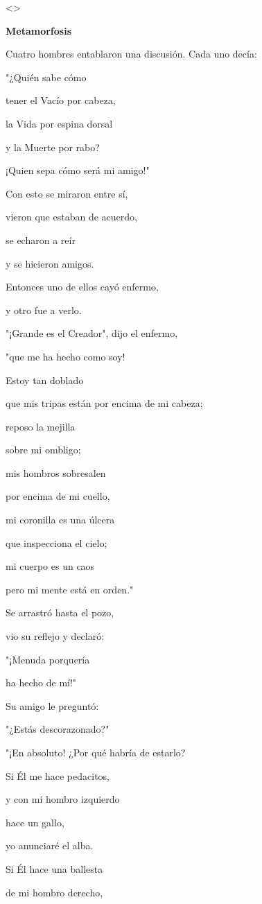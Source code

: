 \textless\textgreater{}

\textbf{{Metamorfosis}}

Cuatro hombres entablaron una discusión. Cada uno decía:

"¿Quién sabe cómo

tener el Vacío por cabeza,

la Vida por espina dorsal

y la Muerte por rabo?

¡Quien sepa cómo será mi amigo!"

Con esto se miraron entre sí,

vieron que estaban de acuerdo,

se echaron a reír

y se hicieron amigos.

Entonces uno de ellos cayó enfermo,

y otro fue a verlo.

"¡Grande es el Creador", dijo el enfermo,

"que me ha hecho como soy!

Estoy tan doblado

que mis tripas están por encima de mi cabeza;

reposo la mejilla

sobre mi ombligo;

mis hombros sobresalen

por encima de mi cuello,

mi coronilla es una úlcera

que inspecciona el cielo;

mi cuerpo es un caos

pero mi mente está en orden."

Se arrastró hasta el pozo,

vio su reflejo y declaró:

"¡Menuda porquería

ha hecho de mí!"

Su amigo le preguntó:

"¿Estás descorazonado?"

"¡En absoluto! ¿Por qué habría de estarlo?

Si Él me hace pedacitos,

y con mi hombro izquierdo

hace un gallo,

yo anunciaré el alba.

Si Él hace una ballesta

de mi hombro derecho,

